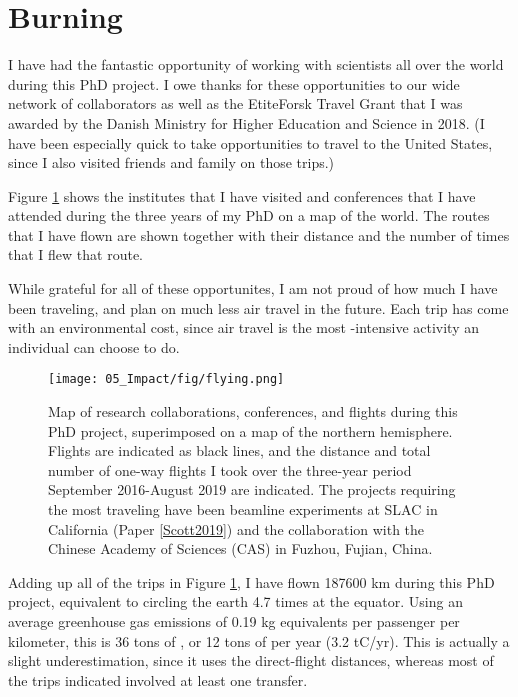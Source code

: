 
\section{Burning}\label{sec:burning}

I have had the fantastic opportunity of working with scientists all over the world during this PhD project. I owe thanks for these opportunities to our wide network of collaborators as well as the EtiteForsk Travel Grant that I was awarded by the Danish Ministry for Higher Education and Science in 2018. (I have been especially quick to take opportunities to travel to the United States, since I also visited friends and family on those trips.)

Figure \ref{fig:flying} shows the institutes that I have visited and conferences that I have attended during the three years of my PhD on a map of the world. The routes that I have flown are shown together with their distance and the number of times that I flew that route.

While grateful for all of these opportunites, I am not proud of how much I have been traveling, and plan on much less air travel in the future. Each trip has come with an environmental cost, since air travel is the most -intensive activity an individual can choose to do.

\begin{figure}[h!]
	\texttt{[image: 05\_Impact/fig/flying.png]}
	\caption{Map of research collaborations, conferences, and flights during this PhD project, superimposed on a map of the northern hemisphere. Flights are indicated as black lines, and the distance and total number of one-way flights I took over the three-year period September 2016-August 2019 are indicated. The projects requiring the most traveling have been beamline experiments at SLAC in California (Paper \ref{Scott2019}) and the collaboration with the Chinese Academy of Sciences (CAS) in Fuzhou, Fujian, China.}
	\label{fig:flying}
\end{figure}

Adding up all of the trips in Figure \ref{fig:flying}, I have flown 187600 km during this PhD project, equivalent to circling the earth 4.7 times at the equator. Using an average greenhouse gas emissions of 0.19 kg  equivalents per passenger per kilometer\cite{Larsson2018}, this is 36 tons of , or 12 tons of  per year (3.2 tC/yr). This is actually a slight underestimation, since it uses the direct-flight distances, whereas most of the trips indicated involved at least one transfer.

